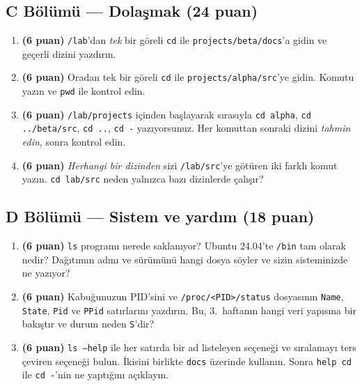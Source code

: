 \documentclass[11pt,a4paper]{article}
\newcommand{\cmd}[1]{\texttt{#1}}
\begin{document}
\subsection*{C Bölümü --- Dolaşmak (24 puan)}
\begin{enumerate}[label=\textbf{C\arabic*}, leftmargin=2.2em, start=9]
  \item \textbf{(6 puan)} \texttt{\tl/lab}'dan \emph{tek} bir göreli \cmd{cd} ile \texttt{projects/beta/docs}'a gidin ve geçerli dizini yazdırın.
  \item \textbf{(6 puan)} Oradan tek bir göreli \cmd{cd} ile \texttt{projects/alpha/src}'ye gidin. Komutu yazın ve \cmd{pwd} ile kontrol edin.
  \item \textbf{(6 puan)} \texttt{\tl/lab/projects} içinden başlayarak sırasıyla \cmd{cd alpha}, \cmd{cd ../beta/src}, \cmd{cd ..}, \cmd{cd -} yazıyorsunuz. Her komuttan sonraki dizini \emph{tahmin edin}, sonra kontrol edin.
  \item \textbf{(6 puan)} \emph{Herhangi bir dizinden} sizi \texttt{\tl/lab/src}'ye götüren iki farklı komut yazın. \cmd{cd lab/src} neden yalnızca bazı dizinlerde çalışır?
\end{enumerate}

\subsection*{D Bölümü --- Sistem ve yardım (18 puan)}
\begin{enumerate}[label=\textbf{D\arabic*}, leftmargin=2.2em, start=13]
  \item \textbf{(6 puan)} \cmd{ls} programı nerede saklanıyor? Ubuntu 24.04'te \texttt{/bin} tam olarak nedir? Dağıtımın adını ve sürümünü hangi dosya söyler ve sizin sisteminizde ne yazıyor?
  \item \textbf{(6 puan)} Kabuğunuzun PID'sini ve \texttt{/proc/<PID>/status} dosyasının \texttt{Name}, \texttt{State}, \texttt{Pid} ve \texttt{PPid} satırlarını yazdırın. Bu, 3.\ haftanın hangi veri yapısına bir bakıştır ve durum neden \texttt{S}'dir?
  \item \textbf{(6 puan)} \cmd{ls --help} ile her satırda bir ad listeleyen seçeneği ve sıralamayı ters çeviren seçeneği bulun. İkisini birlikte \texttt{docs} üzerinde kullanın. Sonra \cmd{help cd} ile \cmd{cd -}'nin ne yaptığını açıklayın.
\end{enumerate}
\end{document}
